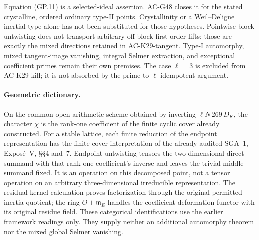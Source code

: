 \begin{remark}
Equation (GP.11) is a selected-ideal assertion.  AC-G48 closes
it for the stated crystalline, ordered ordinary type-II
points.  Crystallinity or a Weil--Deligne inertial type alone
has not been substituted for those hypotheses.  Pointwise
block untwisting does not
transport arbitrary off-block first-order lifts: those are
exactly the mixed directions retained in AC-K29-tangent.
Type-I automorphy, mixed tangent-image vanishing, integral
Selmer extraction, and exceptional coefficient primes remain
their own premises.  The case $\ell=3$ is excluded from
AC-K29-kill; it is not absorbed by the prime-to-$\ell$
idempotent argument.
\end{remark}

\paragraph{Geometric dictionary.}
On the common open arithmetic scheme obtained by inverting
$\ell N\,269\,D_K$, the character $\chi$ is the rank-one
coefficient of the finite cyclic cover already constructed.
For a stable lattice, each finite reduction of the endpoint
representation has the finite-cover interpretation of the
already audited SGA~1, Expos\'e~V, \S\S4 and~7.
Endpoint untwisting tensors the two-dimensional direct summand
with that rank-one coefficient's inverse and leaves the trivial
middle summand fixed.  It is an operation on this decomposed
point, not a tensor operation on an arbitrary three-dimensional
irreducible representation.  The residual-kernel calculation
proves factorization through the original permitted inertia
quotient; the ring $O+\mathfrak m_E$ handles the coefficient
deformation functor with its original residue field.
These categorical identifications use the earlier framework
readings only.  They supply neither an additional automorphy
theorem nor the mixed global Selmer vanishing.
